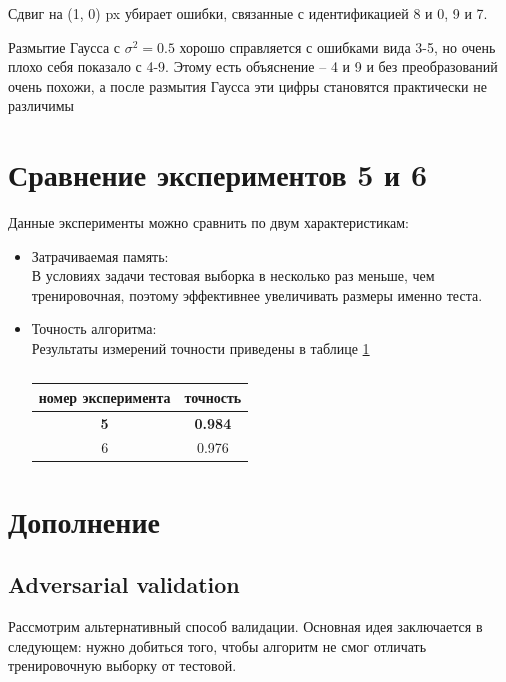 \documentclass[a4paper, 11pt]{article}
\begin{document}
    Сдвиг на (1, 0) px убирает ошибки, связанные с идентификацией 8 и 0, 9 и 7.
    
    Размытие Гаусса с  $\sigma^2 = 0.5$ хорошо справляется с ошибками вида 3-5, но очень плохо себя показало с 4-9. Этому есть объяснение -- 4 и 9 и без преобразований очень похожи, а после размытия Гаусса эти цифры становятся практически не различимы
    
    \section{Сравнение экспериментов 5 и 6}
    Данные эксперименты можно сравнить по двум характеристикам: 
        \begin{itemize}
            \item Затрачиваемая память:
            \\
            В условиях задачи тестовая выборка в несколько раз меньше, чем тренировочная, поэтому эффективнее увеличивать размеры именно теста.
            \item Точность алгоритма:
            \\
            Результаты измерений точности приведены в таблице \ref{comp:table}
            \begin{table}[h]
                \begin{center}
                    \caption{} \label{comp:table}
                    \begin{tabular}{|c|c|}
                        \hline 
                        номер эксперимента & точность \\ 
                        \hline 
                        \textbf{5} & \textbf{0.984} \\ 
                        \hline 
                        6 & 0.976 \\ 
                        \hline 
                    \end{tabular}
               \end{center} 
            \end{table}
            
        \end{itemize}
    \section{Дополнение}
        \subsection{Adversarial validation}
        Рассмотрим альтернативный способ валидации. Основная идея заключается в следующем: нужно добиться того, чтобы алгоритм не смог отличать тренировочную выборку от тестовой.
        
\end{document}
